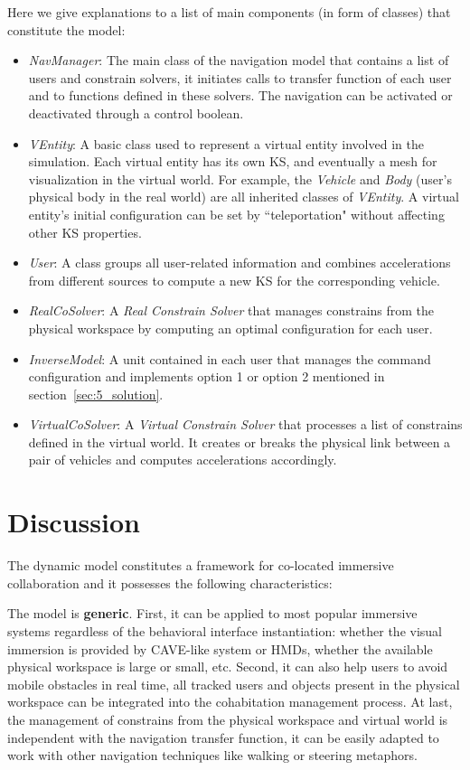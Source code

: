 Here we give explanations to a list of main components (in form of classes) that constitute the model:

\begin{itemize}
\item \textit{NavManager}: The main class of the navigation model that contains a list of users and constrain solvers, it initiates calls to transfer function of each user and to functions defined in these solvers. The navigation can be activated or deactivated through a control boolean.
\item \textit{VEntity}: A basic class used to represent a virtual entity involved in the simulation. Each virtual entity has its own KS, and eventually a mesh for visualization in the virtual world. For example, the \textit{Vehicle} and \textit{Body} (user's physical body in the real world) are all inherited classes of \textit{VEntity}. A virtual entity's initial configuration can be set by ``teleportation" without affecting other KS properties.
\item \textit{User}: A class groups all user-related information and combines accelerations from different sources to compute a new KS for the corresponding vehicle.
\item \textit{RealCoSolver}: A \textit{Real Constrain Solver} that manages constrains from the physical workspace by computing an optimal configuration for each user.
\item \textit{InverseModel}: A unit contained in each user that manages the command configuration and implements option 1 or option 2 mentioned in section~\ref{sec:5_solution}.
\item \textit{VirtualCoSolver}: A \textit{Virtual Constrain Solver} that processes a list of constrains defined in the virtual world. It creates or breaks the physical link between a pair of vehicles and computes accelerations accordingly. 
\end{itemize}


\section{Discussion}

The dynamic model constitutes a framework for co-located immersive collaboration and it possesses the following characteristics:

The model is \textbf{generic}. First, it can be applied to most popular immersive systems regardless of the behavioral interface instantiation: whether the visual immersion is provided by CAVE-like system or HMDs, whether the available physical workspace is large or small, etc. Second, it can also help users to avoid mobile obstacles in real time, all tracked users and objects present in the physical workspace can be integrated into the cohabitation management process. At last, the management of constrains from the physical workspace and virtual world is independent with the navigation transfer function, it can be easily adapted to work with other navigation techniques like walking or steering metaphors.

